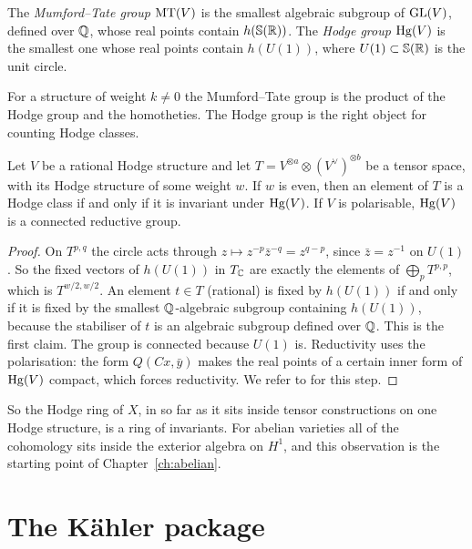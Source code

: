 \begin{definition}
The \emph{Mumford--Tate group} $\operatorname{MT}(V)$ is the smallest algebraic subgroup
of $\operatorname{GL}(V)$, defined over $\mathbb{Q}$, whose real points contain $h(\mathbb
S(\mathbb{R}))$. The \emph{Hodge group} $\operatorname{Hg}(V)$ is the smallest one whose real
points contain $h(U(1))$, where $U(1)\subset\mathbb S(\mathbb{R})$ is the unit
circle.
\end{definition}

For a structure of weight $k\ne0$ the Mumford--Tate group is the product of
the Hodge group and the homotheties. The Hodge group is the right object
for counting Hodge classes.

\begin{theorem}\label{thm:hginvariants}
Let $V$ be a rational Hodge structure and let $T=V^{\otimes a}\otimes
(V^{\vee})^{\otimes b}$ be a tensor space, with its Hodge structure of some
weight $w$. If $w$ is even, then an element of $T$ is a Hodge class if and
only if it is invariant under $\operatorname{Hg}(V)$. If $V$ is polarisable, $\operatorname{Hg}(V)$ is
a connected reductive group.
\end{theorem}

\begin{proof}
On $T^{p,q}$ the circle acts through $z\mapsto z^{-p}\bar z^{-q}=z^{q-p}$,
since $\bar z=z^{-1}$ on $U(1)$. So the fixed vectors of $h(U(1))$ in
$T_{\mathbb{C}}$ are exactly the elements of $\bigoplus_{p}T^{p,p}$, which is
$T^{w/2,w/2}$. An element $t\in T$ (rational) is fixed by $h(U(1))$ if and
only if it is fixed by the smallest $\mathbb{Q}$-algebraic subgroup containing
$h(U(1))$, because the stabiliser of $t$ is an algebraic subgroup defined
over $\mathbb{Q}$. This is the first claim. The group is connected because $U(1)$
is. Reductivity uses the polarisation: the form $Q(Cx,\bar y)$ makes the
real points of a certain inner form of $\operatorname{Hg}(V)$ compact, which forces
reductivity. We refer to \cite{Del82} for this step.
\end{proof}

So the Hodge ring of $X$, in so far as it sits inside tensor constructions
on one Hodge structure, is a ring of invariants. For abelian varieties all
of the cohomology sits inside the exterior algebra on $H^{1}$, and this
observation is the starting point of Chapter~\ref{ch:abelian}.

\section{The K\"ahler package}\label{sec:kahler}

